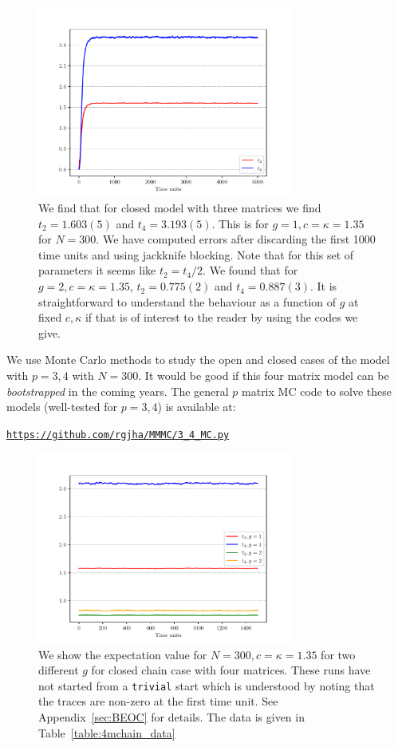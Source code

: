 \documentclass[letter,11pt]{article}
\begin{document}
\begin{figure}[htbp] 
	\centering 
	\includegraphics[width=0.75\textwidth]{figs/3MM_closed.pdf}
	\caption{\label{fig:3MM_closed}We find that for closed model with three matrices we find $t_{2} = 1.603(5)$ and $t_{4} = 3.193(5)$. 
	This is for $g=1, c=\kappa=1.35$ for $N=300$. We have computed errors after discarding the first 1000 time units and 
	using jackknife blocking. Note that for this set of parameters it seems like $t_{2} = t_{4}/2$. We found that 
	for $g=2, c=\kappa=1.35$, $t_{2} = 0.775(2)$ and $t_{4} = 0.887(3)$. It is straightforward to understand the behaviour as a function of $g$ at fixed $c, \kappa$ if that is of interest to the reader by using the codes we give.}
\end{figure}
We use Monte Carlo methods to study the open and closed cases of the model with $p = 3,4$ with 
$N = 300$. It would be good if this four matrix model can be \textit{bootstrapped} in the coming years. 
The general $p$ matrix MC code to solve these models 
(well-tested for $p = 3,4$) is available at: 
\begin{center} \texttt{\href{https://github.com/rgjha/MMMC/3\_4\ _MC.py}{https://github.com/rgjha/MMMC/3\_4\_MC.py}} \end{center}

\begin{figure}[htbp] 
	\centering 
	\includegraphics[width=0.75\textwidth]{figs/4MM_g1_g2.pdf}
\caption{\label{fig:4MM_closed1} We show the expectation value for $N=300, c=\kappa=1.35$ for two different $g$ for closed chain case with four matrices. These runs have not started from a \texttt{trivial} start
	which is understood by noting that the traces are non-zero at the first time unit. See Appendix~\ref{sec:BEOC} for details. The data is given in Table~\ref{table:4mchain_data}}
\end{figure}
\end{document}
